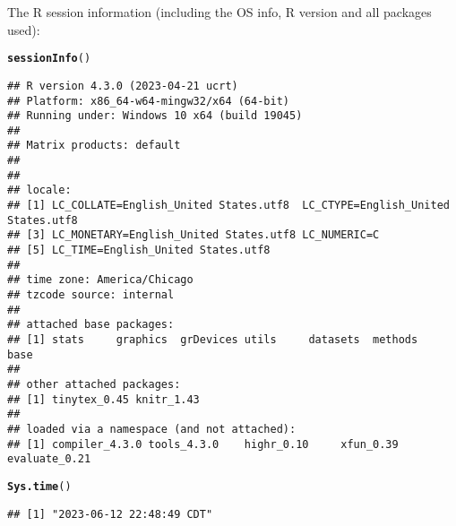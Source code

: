 \documentclass{article}\usepackage[]{graphicx}\usepackage[]{xcolor}
\makeatletter
\newcommand{\hlstd}[1]{\textcolor[rgb]{0.345,0.345,0.345}{#1}}%
\newcommand{\hlkwd}[1]{\textcolor[rgb]{0.737,0.353,0.396}{\textbf{#1}}}%
\newenvironment{kframe}{%
 \def\at@end@of@kframe{}%
 \ifinner\ifhmode%
  \def\at@end@of@kframe{\end{minipage}}%
  \begin{minipage}{\columnwidth}%
 \fi\fi%
 \def\FrameCommand##1{\hskip\@totalleftmargin \hskip-\fboxsep
 \colorbox{shadecolor}{##1}\hskip-\fboxsep
     \hskip-\linewidth \hskip-\@totalleftmargin \hskip\columnwidth}%
 \MakeFramed {\advance\hsize-\width
   \@totalleftmargin\z@ \linewidth\hsize
   \@setminipage}}%
 {\par\unskip\endMakeFramed%
 \at@end@of@kframe}
\newenvironment{knitrout}{}{} %
\makeatother
\begin{document}
The R session information (including the OS info, R version and all
packages used):

\begin{knitrout}
\color{fgcolor}\begin{kframe}
\begin{alltt}
\hlkwd{sessionInfo}\hlstd{()}
\end{alltt}
\begin{verbatim}
## R version 4.3.0 (2023-04-21 ucrt)
## Platform: x86_64-w64-mingw32/x64 (64-bit)
## Running under: Windows 10 x64 (build 19045)
## 
## Matrix products: default
## 
## 
## locale:
## [1] LC_COLLATE=English_United States.utf8  LC_CTYPE=English_United States.utf8   
## [3] LC_MONETARY=English_United States.utf8 LC_NUMERIC=C                          
## [5] LC_TIME=English_United States.utf8    
## 
## time zone: America/Chicago
## tzcode source: internal
## 
## attached base packages:
## [1] stats     graphics  grDevices utils     datasets  methods   base     
## 
## other attached packages:
## [1] tinytex_0.45 knitr_1.43  
## 
## loaded via a namespace (and not attached):
## [1] compiler_4.3.0 tools_4.3.0    highr_0.10     xfun_0.39      evaluate_0.21
\end{verbatim}
\begin{alltt}
\hlkwd{Sys.time}\hlstd{()}
\end{alltt}
\begin{verbatim}
## [1] "2023-06-12 22:48:49 CDT"
\end{verbatim}
\end{kframe}
\end{knitrout}
\end{document}
